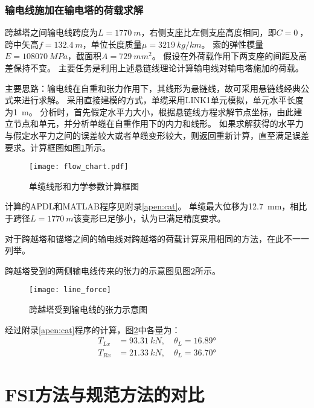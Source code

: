 \subsubsection{输电线施加在输电塔的荷载求解}

跨越塔之间输电线跨度为$L=\SI{1770}{m}$，右侧支座比左侧支座高度相同，即$C=\SI{0}{}$，跨中矢高$f=\SI{132.4}{m}$，单位长度质量$\mu=\SI{3219}{kg/km}$。
索的弹性模量$E=\SI{108070}{MPa}$，截面积$A=\SI{729}{mm^2}$。
假设在外荷载作用下两支座的间距及高差保持不变。
主要任务是利用上述悬链线理论计算输电线对输电塔施加的荷载。

主要思路：输电线在自重和张力作用下，其线形为悬链线，故可采用悬链线经典公式来进行求解。
采用直接建模的方式，单缆采用LINK1单元模拟，单元水平长度为\SI{1}{m}。
分析时，首先假定水平力大小，根据悬链线方程求解节点坐标，由此建立节点和单元，并分析单缆在自重作用下的内力和线形。
如果求解获得的水平力与假定水平力之间的误差较大或者单缆变形较大，则返回重新计算，直至满足误差要求。计算框图如图\ref{fig:flow-chart}所示。

\begin{figure}[!htpb]
	\centering
	\texttt{[image: flow\_chart.pdf]}
	\caption{单缆线形和力学参数计算框图}
	\label{fig:flow-chart}
\end{figure}

计算的APDL和MATLAB程序见附录\ref{apen:cat}。
单缆最大位移为\SI{12.7}{mm}，相比于跨径$L=\SI{1770}{m}$该变形已足够小，认为已满足精度要求。

对于跨越塔和锚塔之间的输电线对跨越塔的荷载计算采用相同的方法，在此不一一列举。

跨越塔受到的两侧输电线传来的张力的示意图见图\ref{fig:line-force}所示。

\begin{figure}[!htbp]
	\centering
	\texttt{[image: line\_force]}
	\caption{跨越塔受到输电线的张力示意图}
	\label{fig:line-force}
\end{figure}

经过附录\ref{apen:cat}程序的计算，图\ref{fig:line-force}中各量为：
\begin{equation}
	\begin{split}
		T_{Lx} & = \SI{93.31}{kN},\quad \theta_L  = \ang{16.89} \\
		T_{Rx} & = \SI{21.33}{kN},\quad \theta_L  = \ang{36.70}
	\end{split}
\end{equation}


\section{FSI方法与规范方法的对比}

